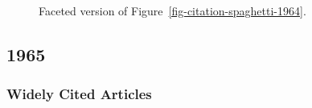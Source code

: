 \documentclass[
  10pt,
  letterpaper,
  DIV=11,
  numbers=noendperiod,
  twoside]{scrartcl}
\begin{document}
\begin{figure}


\caption{\label{fig-citation-facet-1964}Faceted version of
Figure~\ref{fig-citation-spaghetti-1964}.}

\end{figure}%

\newpage

\subsection{1965}\label{sec-s1965}

\subsubsection*{Widely Cited Articles}\label{widely-cited-articles-8}
\end{document}
